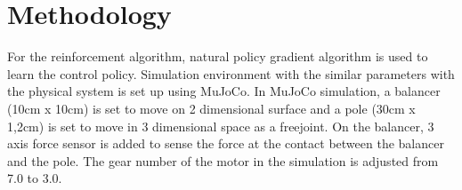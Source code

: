 \documentclass{article}
\begin{document}
%
%

%


\section{Methodology}

For the reinforcement algorithm, natural policy gradient algorithm is used to learn the control policy. Simulation environment with the similar parameters with the physical system is set up using MuJoCo. In MuJoCo simulation, a balancer (10cm x 10cm) is set to move on 2 dimensional surface and a pole (30cm x 1,2cm) is set to move in 3 dimensional space as a freejoint. On the balancer, 3 axis force sensor is added to sense the force at the contact between the balancer and the pole. The gear number of the motor in the simulation is adjusted from 7.0 to 3.0. 
\end{document}
